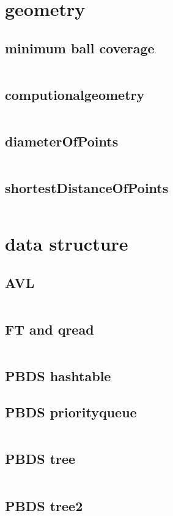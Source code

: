 \section{geometry}
\subsection{minimum ball coverage}
  \inputminted{cpp}{../code/geometry/minimum_ball_coverage.cpp}
\subsection{computionalgeometry}
  \inputminted{cpp}{../code/geometry/computionalgeometry.cpp}
\subsection{diameterOfPoints}
  \inputminted{cpp}{../code/geometry/diameterOfPoints.cpp}
\subsection{shortestDistanceOfPoints}
  \inputminted{cpp}{../code/geometry/shortestDistanceOfPoints.cpp}
\section{data structure}
\subsection{AVL}
  \inputminted{cpp}{../code/data_structure/AVL.cpp}
\subsection{FT and qread}
  \inputminted{cpp}{../code/data_structure/FT_and_qread.cpp}
\subsection{PBDS hashtable}
\subsection{PBDS priorityqueue}
  \inputminted{cpp}{../code/data_structure/PBDS_priorityqueue.cpp}
\subsection{PBDS tree}
  \inputminted{cpp}{../code/data_structure/PBDS_tree.cpp}
\subsection{PBDS tree2}
  \inputminted{cpp}{../code/data_structure/PBDS_tree2.cpp}
